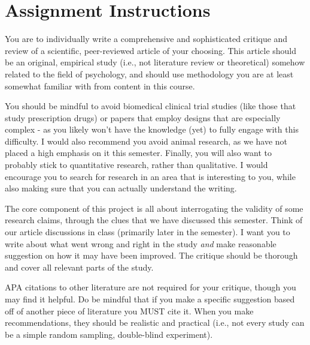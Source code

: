 \documentclass[
  12pt,
  letterpaper,
]{scrartcl}
\renewcommand*\contentsname{Table of contents}
\newcommand\contentsname{Table of contents}
\begin{document}


\pagestyle{scrheadings}

\frenchspacing %

\renewcommand*\contentsname{Table of Contents}
{
\hypersetup{linkcolor=}
\setcounter{tocdepth}{2}
\tableofcontents
}

\newpage{}

\section{Assignment Instructions}\label{assignment-instructions}

You are to individually write a comprehensive and sophisticated critique
and review of a scientific, peer-reviewed article of your choosing. This
article should be an original, empirical study (i.e., not literature
review or theoretical) somehow related to the field of psychology, and
should use methodology you are at least somewhat familiar with from
content in this course.

You should be mindful to avoid biomedical clinical trial studies (like
those that study prescription drugs) or papers that employ designs that
are especially complex - as you likely won't have the knowledge (yet) to
fully engage with this difficulty. I would also recommend you avoid
animal research, as we have not placed a high emphasis on it this
semester. Finally, you will also want to probably stick to quantitative
research, rather than qualitative. I would encourage you to search for
research in an area that is interesting to you, while also making sure
that you can actually understand the writing.

The core component of this project is all about interrogating the
validity of some research claims, through the clues that we have
discussed this semester. Think of our article discussions in class
(primarily later in the semester). I want you to write about what went
wrong and right in the study \emph{and} make reasonable suggestion on
how it may have been improved. The critique should be thorough and cover
all relevant parts of the study.

APA citations to other literature are not required for your critique,
though you may find it helpful. Do be mindful that if you make a
specific suggestion based off of another piece of literature you MUST
cite it. When you make recommendations, they should be realistic and
practical (i.e., not every study can be a simple random sampling,
double-blind experiment).
\end{document}
